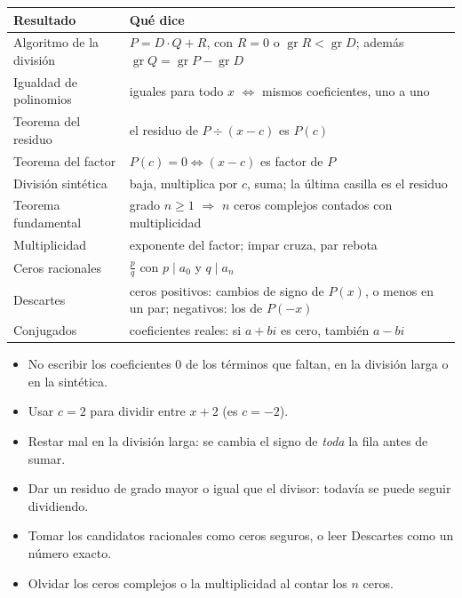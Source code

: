 \documentclass[11pt,a4paper]{article}
\newcommand{\gr}{\operatorname{gr}}
\begin{document}
\clearpage
\repaso
\begin{center}
\begin{tabularx}{\linewidth}{@{}l L@{}}
\toprule
Resultado & Qué dice\\ \midrule
Algoritmo de la división & $P=D\cdot Q+R$, con $R=0$ o $\gr R<\gr D$; además $\gr Q=\gr P-\gr D$\\
Igualdad de polinomios & iguales para todo $x$ $\iff$ mismos coeficientes, uno a uno\\
Teorema del residuo & el residuo de $P\div(x-c)$ es $P(c)$\\
Teorema del factor & $P(c)=0\iff(x-c)$ es factor de $P$\\
División sintética & baja, multiplica por $c$, suma; la última casilla es el residuo\\
Teorema fundamental & grado $n\ge1$ $\Rightarrow$ $n$ ceros complejos contados con multiplicidad\\
Multiplicidad & exponente del factor; impar cruza, par rebota\\
Ceros racionales & $\tfrac{p}{q}$ con $p\mid a_0$ y $q\mid a_n$\\
Descartes & ceros positivos: cambios de signo de $P(x)$, o menos en un par; negativos: los de $P(-x)$\\
Conjugados & coeficientes reales: si $a+bi$ es cero, también $a-bi$\\
\bottomrule
\end{tabularx}
\end{center}

\begin{ojo}
\begin{itemize}
\item No escribir los coeficientes $0$ de los términos que faltan, en la división larga o en la sintética.
\item Usar $c=2$ para dividir entre $x+2$ (es $c=-2$).
\item Restar mal en la división larga: se cambia el signo de \emph{toda} la fila antes de sumar.
\item Dar un residuo de grado mayor o igual que el divisor: todavía se puede seguir dividiendo.
\item Tomar los candidatos racionales como ceros seguros, o leer Descartes como un número exacto.
\item Olvidar los ceros complejos o la multiplicidad al contar los $n$ ceros.
\end{itemize}
\end{ojo}
\end{document}
